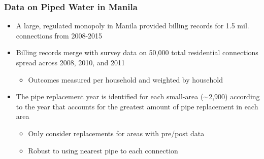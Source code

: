 \documentclass[aspectratio=32]{beamer}
\begin{document}

\begin{frame}
\frametitle{Data on Piped Water in Manila}
\centering

\begin{itemize}
  \item A large, regulated monopoly in Manila provided billing records for 1.5 mil. connections from 2008-2015
  \vspace{3mm}
  \item Billing records merge with survey data on 50,000 total residential connections spread across 2008, 2010, and 2011
    \begin{itemize}
      \item Outcomes measured per household and weighted by household
    \end{itemize}
  \vspace{3mm}
  \item The pipe replacement year is identified for each small-area ($\sim$2,900) according to the year  that accounts for the greatest amount of pipe replacement in each area
    \begin{itemize}
      \item Only consider replacements for areas with pre/post data
      \item Robust to using nearest pipe to each connection
    \end{itemize}
\end{itemize}


\end{frame}




\end{document}
